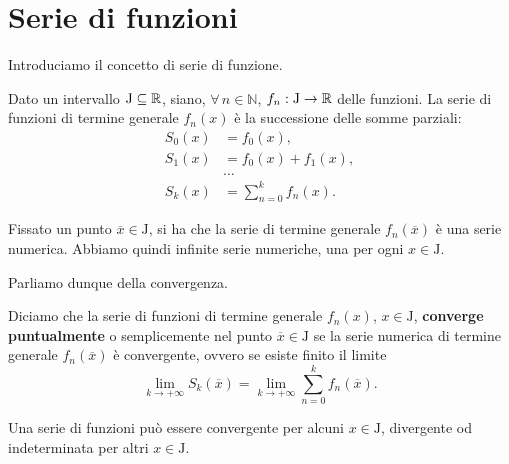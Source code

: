 \documentclass[../../analisi2]{subfiles}
\begin{document}
    \chapter{Serie di funzioni}

        Introduciamo il concetto di serie di funzione.

        \begin{definizione}
            Dato un intervallo \(\mathrm{J} \subseteq \mathbb{R}\), siano, \(\forall \, n \in \mathbb{N}\), \(f_n : \mathrm{J} \to \mathbb{R}\) delle
            funzioni. La serie di funzioni di termine generale \(f_n(x)\) è la successione delle somme parziali:
            \begin{align*}
                S_0 (x) &= f_0 (x),\\
                S_1 (x) &= f_0 (x) + f_1 (x),\\
                &\dots\\
                S_k (x) &= \sum_{n = 0}^k f_n (x).
            \end{align*}
        \end{definizione}
        \begin{osservazione}
            Fissato un punto \(\overline{x} \in \mathrm{J}\), si ha che la serie di termine generale \(f_n (\overline{x})\) è una serie
            numerica. Abbiamo quindi infinite serie numeriche, una per ogni \(x \in \mathrm{J}\).
        \end{osservazione}

        Parliamo dunque della convergenza.
        
        \begin{definizione}
            Diciamo che la serie di funzioni di termine generale \(f_n (x)\), \(x \in \mathrm{J}\), \textbf{converge puntualmente} o
            semplicemente nel punto \(\overline{x} \in \mathrm{J}\) se la serie numerica di termine generale \(f_n (\overline{x})\) è
            convergente, ovvero se esiste finito il limite
            \[
                \lim_{k \to +\infty} S_k(\overline{x}) = \lim_{k \to +\infty} \sum_{n = 0}^k f_n (\overline{x}).
            \]
        \end{definizione}
        \begin{osservazione}
            Una serie di funzioni può essere convergente per alcuni \(x \in \mathrm{J}\), divergente od indeterminata per altri
            \(x \in \mathrm{J}\).
        \end{osservazione}
\end{document}
